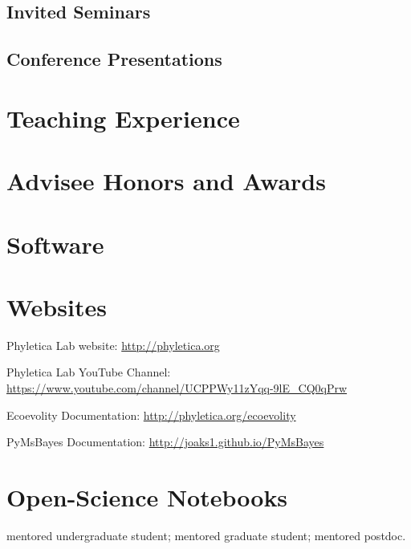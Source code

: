 \subsection*{Invited Seminars}
\nocite{*}
\printbibliography[filter=invitedpresentation, heading=none]

\subsection*{Conference Presentations}
\nocite{*}
\printbibliography[filter=presentation, heading=none]

\section*{Teaching Experience}


\section*{Advisee Honors and Awards}


\section*{Software}


\section*{Websites}
\begin{tightItemize}
    \item Phyletica Lab website: \url{http://phyletica.org}
    \item Phyletica Lab YouTube Channel: \url{https://www.youtube.com/channel/UCPPWy11zYqq-9lE_CQ0qPrw}
    \item Ecoevolity Documentation: \url{http://phyletica.org/ecoevolity}
    \item PyMsBayes Documentation: \url{http://joaks1.github.io/PyMsBayes}
\end{tightItemize}

\section*{Open-Science Notebooks}
\ugsymbol{}mentored undergraduate student;
\phdsymbol{}mentored graduate student;
\postdocsymbol{}mentored postdoc.
\nocite{*}
\printbibliography[filter=openscinotebooks, heading=none]


